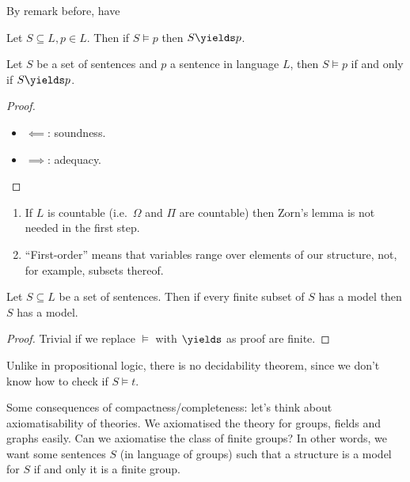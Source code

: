\documentclass[a4paper]{article}
\begin{document}
By remark before, have

\begin{corollary}[Adequacy]
  Let \(S \subseteq L, p \in L\). Then if \(S \models p\) then \(S \yields p\).
\end{corollary}

\begin{theorem}
  \label{thm:Gödel completeness theorem}
  Let \(S\) be a set of sentences and \(p\) a sentence in language \(L\), then \(S \models p\) if and only if \(S \yields p\).
\end{theorem}

\begin{proof}\leavevmode
  \begin{itemize}
  \item \(\impliedby\): soundness.
  \item \(\implies\): adequacy.
  \end{itemize}
\end{proof}

\begin{remark}\leavevmode
  \begin{enumerate}
  \item If \(L\) is countable (i.e.\ \(\Omega\) and \(\Pi\) are countable) then Zorn's lemma is not needed in the first step.
  \item ``First-order'' means that variables range over elements of our structure, not, for example, subsets thereof.
  \end{enumerate}
\end{remark}

\begin{theorem}[Compactness]
  Let \(S \subseteq L\) be a set of sentences. Then if every finite subset of \(S\) has a model then \(S\) has a model.
\end{theorem}

\begin{proof}
  Trivial if we replace \(\models\) with \(\yields\) as proof are finite.
\end{proof}

\begin{note}
  Unlike in propositional logic, there is no decidability theorem, since we don't know how to check if \(S \models t\).
\end{note}

Some consequences of compactness/completeness: let's think about axiomatisability of theories. We axiomatised the theory for groups, fields and graphs easily. Can we axiomatise the class of finite groups? In other words, we want some sentences \(S\) (in language of groups) such that a structure is a model for \(S\) if and only it is a finite group.
\end{document}

